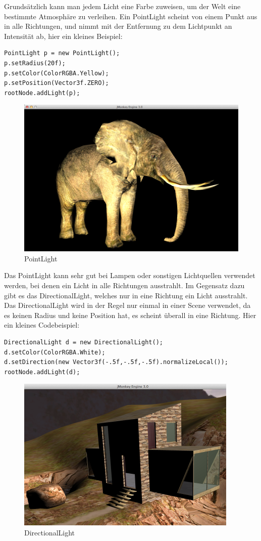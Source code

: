 Grundsätzlich kann man jedem Licht eine Farbe zuweisen, um der Welt eine bestimmte Atmosphäre zu verleihen. Ein PointLight scheint von einem Punkt aus in alle Richtungen, und nimmt mit der Entfernung zu dem Lichtpunkt an Intensität ab, hier ein kleines Beispiel:
\begin{lstlisting}
PointLight p = new PointLight();
p.setRadius(20f);
p.setColor(ColorRGBA.Yellow);
p.setPosition(Vector3f.ZERO);
rootNode.addLight(p);
\end{lstlisting}
\begin{center}
	\begin{figure}[h!]
		
		
		\caption{PointLight}
		
		\includegraphics[width=.5\linewidth]{images/pointlight} 
		
	\end{figure}  
\end{center}
Das PointLight kann sehr gut bei Lampen oder sonstigen Lichtquellen verwendet werden, bei denen ein Licht in alle Richtungen ausstrahlt. Im Gegensatz dazu gibt es das DirectionalLight, welches nur in eine Richtung ein Licht ausstrahlt. Das DirectionalLight wird in der Regel nur einmal in einer Scene verwendet, da es keinen Radius und keine Position hat, es scheint überall in eine Richtung. Hier ein kleines Codebeispiel:
\begin{lstlisting}
DirectionalLight d = new DirectionalLight();
d.setColor(ColorRGBA.White);
d.setDirection(new Vector3f(-.5f,-.5f,-.5f).normalizeLocal());
rootNode.addLight(d);
\end{lstlisting}
\begin{center}
	\begin{figure}[h!]
		
		
		\caption{DirectionalLight}
		
		\includegraphics[width=.5\linewidth]{images/directionallight} 
		
	\end{figure}  
\end{center}
